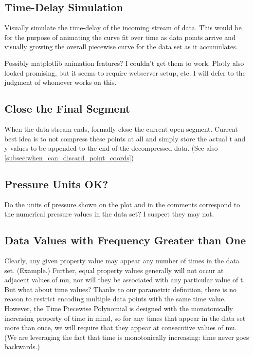 \documentclass{article}
\begin{document}
\subsection{Time-Delay Simulation}
Visually simulate the time-delay of the incoming stream of data. This would be for the purpose of animating the curve fit over time as data points arrive and visually growing the overall piecewise curve for the data set as it accumulates.

Possibly matplotlib animation features? I couldn’t get them to work. Plotly also looked promising, but it seems to require webserver setup, etc.
I will defer to the judgment of whomever works on this.


\subsection{Close the Final Segment}
\label{subsec:close_the_final_segment}
When the data stream ends, formally close the current open segment. Current best idea is to not compress these points at all and simply store the actual t and y values to be appended to the end of the decompressed data. (See also \ref{subsec:when_can_discard_point_coords})

\subsection{Pressure Units OK?}
Do the units of pressure shown on the plot and in the comments correspond to the numerical pressure values in the data set? I suspect they may not.


\subsection{Data Values with Frequency Greater than One}
Clearly, any given property value may appear any number of times in the data set. (Example.) Further, equal property values generally will not occur at adjacent values of mu, nor will they be associated with any particular value of t.
But what about time values? Thanks to our parametric definition, there is no reason to restrict encoding multiple data points with the same time value. However, the Time Piecewise Polynomial is designed with the monotonically increasing property of time in mind, so for any times that appear in the data set more than once, we will require that they appear at consecutive values of mu. 
(We are leveraging the fact that time is monotonically increasing: time never goes backwards.)
\end{document}

